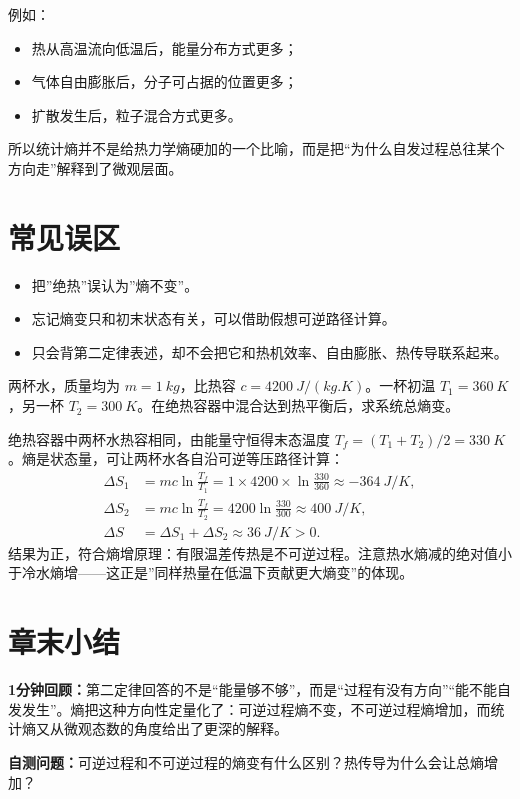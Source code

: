 \documentclass[lang=cn,11pt]{elegantbook}
\newcommand{\summaryline}[1]{\par\noindent\textbf{1分钟回顾：}#1\par}
\newcommand{\chapterselfcheck}[1]{\par\noindent\textbf{自测问题：}#1\par}
\begin{document}
例如：
\begin{itemize}
 \item 热从高温流向低温后，能量分布方式更多；
 \item 气体自由膨胀后，分子可占据的位置更多；
 \item 扩散发生后，粒子混合方式更多。
\end{itemize}

所以统计熵并不是给热力学熵硬加的一个比喻，而是把“为什么自发过程总往某个方向走”解释到了微观层面。

\section{常见误区}

\begin{itemize}
 \item 把”绝热”误认为”熵不变”。
 \item 忘记熵变只和初末状态有关，可以借助假想可逆路径计算。
 \item 只会背第二定律表述，却不会把它和热机效率、自由膨胀、热传导联系起来。
\end{itemize}

\begin{exercise}
两杯水，质量均为 \(m=\SI{1}{kg}\)，比热容 \(c=\SI{4200}{J/(kg.K)}\)。一杯初温 \(T_1=\SI{360}{K}\)，另一杯 \(T_2=\SI{300}{K}\)。在绝热容器中混合达到热平衡后，求系统总熵变。
\end{exercise}
\begin{solution}
绝热容器中两杯水热容相同，由能量守恒得末态温度 \(T_f=(T_1+T_2)/2=\SI{330}{K}\)。熵是状态量，可让两杯水各自沿可逆等压路径计算：
\[
\begin{aligned}
\Delta S_1&=mc\ln\frac{T_f}{T_1}
=1\times4200\times\ln\frac{330}{360}
\approx\SI{-364}{J/K},\\
\Delta S_2&=mc\ln\frac{T_f}{T_2}
=4200\ln\frac{330}{300}
\approx\SI{+400}{J/K},\\
\Delta S&=\Delta S_1+\Delta S_2
\approx\SI{+36}{J/K}>0.
\end{aligned}
\]
结果为正，符合熵增原理：有限温差传热是不可逆过程。注意热水熵减的绝对值小于冷水熵增——这正是”同样热量在低温下贡献更大熵变”的体现。
\end{solution}

\section{章末小结}

\summaryline{第二定律回答的不是“能量够不够”，而是“过程有没有方向”“能不能自发发生”。熵把这种方向性定量化了：可逆过程熵不变，不可逆过程熵增加，而统计熵又从微观态数的角度给出了更深的解释。}
\chapterselfcheck{可逆过程和不可逆过程的熵变有什么区别？热传导为什么会让总熵增加？}
\end{document}
